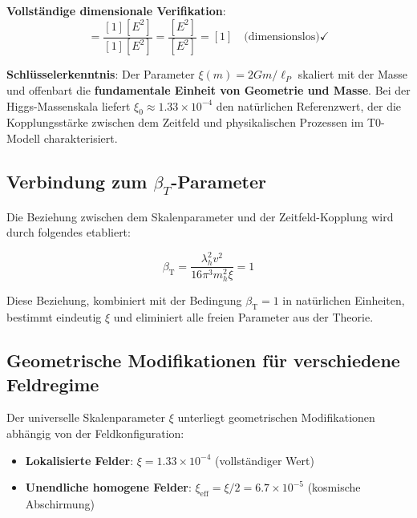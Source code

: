 \documentclass[12pt,a4paper]{article}
\newcommand{\betaT}{\beta_{\text{T}}}
\newcommand{\xipar}{\xi}
\theoremstyle{definition}
\theoremstyle{remark}
\begin{document}
	\textbf{Vollständige dimensionale Verifikation}:
	\begin{equation}
		[\xi] = \frac{[1][E^2]}{[1][E^2]} = \frac{[E^2]}{[E^2]} = [1] \quad \text{(dimensionslos)} \checkmark
	\end{equation}
	
\begin{tcolorbox}[colback=green!5!white,colframe=green!75!black,title=Universeller Skalenparameter]
	\textbf{Schlüsselerkenntnis}: Der Parameter $\xi(m) = 2Gm/\ell_P$ skaliert mit der Masse und offenbart die \textbf{fundamentale Einheit von Geometrie und Masse}. Bei der Higgs-Massenskala liefert $\xi_0 \approx 1.33 \times 10^{-4}$ den natürlichen Referenzwert, der die Kopplungsstärke zwischen dem Zeitfeld und physikalischen Prozessen im T0-Modell charakterisiert.
\end{tcolorbox}
	
	\subsection{Verbindung zum $\beta_T$-Parameter}
	\label{subsec:beta_t_verbindung}
	
	Die Beziehung zwischen dem Skalenparameter und der Zeitfeld-Kopplung wird durch folgendes etabliert:
	
	\begin{equation}
		\betaT = \frac{\lambda_h^2 v^2}{16\pi^3 m_h^2 \xi} = 1
		\label{eq:beta_t_beziehung}
	\end{equation}
	
	Diese Beziehung, kombiniert mit der Bedingung $\betaT = 1$ in natürlichen Einheiten, bestimmt eindeutig $\xipar$ und eliminiert alle freien Parameter aus der Theorie.
	
	\subsection{Geometrische Modifikationen für verschiedene Feldregime}
	\label{subsec:geometrische_modifikationen}
	
	Der universelle Skalenparameter $\xipar$ unterliegt geometrischen Modifikationen abhängig von der Feldkonfiguration:
	
	\begin{itemize}
		\item \textbf{Lokalisierte Felder}: $\xipar = 1.33 \times 10^{-4}$ (vollständiger Wert)
		\item \textbf{Unendliche homogene Felder}: $\xi_{\text{eff}} = \xipar/2 = 6.7 \times 10^{-5}$ (kosmische Abschirmung)
	\end{itemize}
	
\end{document}
